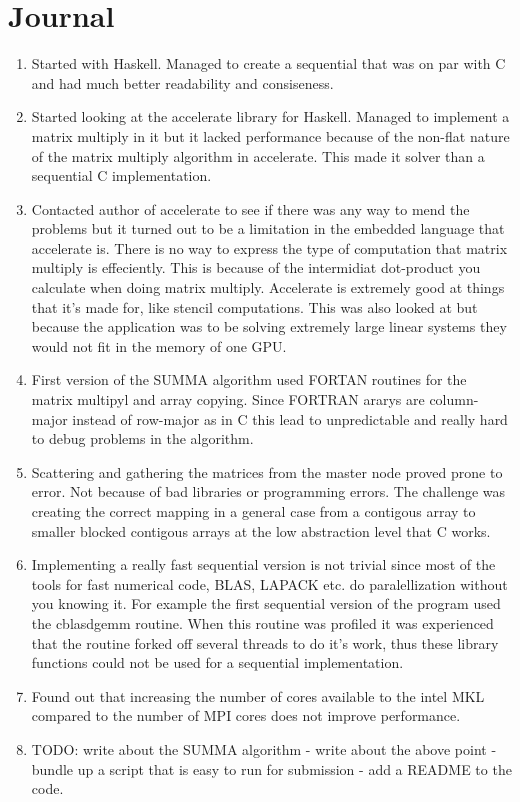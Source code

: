 \documentclass{article}
\begin{document}
\section{Journal}
\begin{enumerate}
	\item Started with Haskell. Managed to create a sequential that was on par with C and had much better readability and consiseness.
	\item Started looking at the accelerate library for Haskell. Managed to implement a matrix multiply in it but it lacked performance because of the non-flat nature of the matrix multiply algorithm in accelerate. This made it solver than a sequential C implementation.
	\item Contacted author of accelerate to see if there was any way to mend the problems but it turned out to be a limitation in the embedded language that accelerate is. There is no way to express the type of computation that matrix multiply is effeciently. This is because of the intermidiat dot-product you calculate when doing matrix multiply. Accelerate is extremely good at things that it's made for, like stencil computations. This was also looked at but because the application was to be solving extremely large linear systems they would not fit in the memory of one GPU.
	\item First version of the SUMMA algorithm used FORTAN routines for the matrix multipyl and array copying. Since FORTRAN ararys are column-major instead of row-major as in C this lead to unpredictable and really hard to debug problems in the algorithm.
	\item Scattering and gathering the matrices from the master node proved prone to error. Not because of bad libraries or programming errors. The challenge was creating the correct mapping in a general case from a contigous array to smaller blocked contigous arrays at the low abstraction level that C works.
	\item Implementing a really fast sequential version is not trivial since most of the tools for fast numerical code, BLAS, LAPACK etc. do paralellization without you knowing it. For example the first sequential version of the program used the cblas\textunderscore dgemm routine. When this routine was profiled it was experienced that the routine forked off several threads to do it's work, thus these library functions could not be used for a sequential implementation.
	\item Found out that increasing the number of cores available to the intel MKL compared to the number of MPI cores does not improve performance.
	\item TODO: write about the SUMMA algorithm - write about the above point - bundle up a script that is easy to run for submission - add a README to the code.
\end{enumerate}
\end{document}
